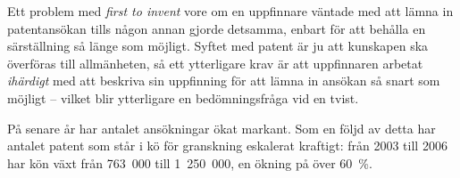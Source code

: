 Ett problem med \emph{first to invent} vore om en uppfinnare väntade med att lämna in patentansökan tills någon annan gjorde detsamma, enbart för att behålla en särställning så länge som möjligt. Syftet med patent är ju att kunskapen ska överföras till allmänheten, så ett ytterligare krav är att uppfinnaren arbetat \emph{ihärdigt} med att beskriva sin uppfinning för att lämna in ansökan så snart som möjligt -- vilket blir ytterligare en bedömningsfråga vid en tvist.





På senare år har antalet ansökningar ökat markant. Som en följd av detta har antalet patent som står i kö för granskning eskalerat kraftigt: från 2003 till 2006 har kön växt från 763~000 till 1~250~000, en ökning på över 60~\%.
